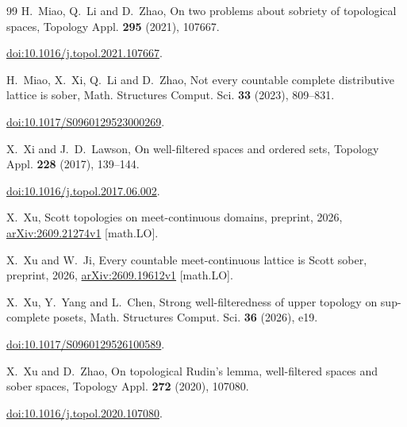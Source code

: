 \documentclass[fleqn,preprint,3p,a4paper]{elsarticle}
\theoremstyle{definition}
\begin{document}
\begin{thebibliography}{99}
H.~Miao, Q.~Li and D.~Zhao,
On two problems about sobriety of topological spaces,
Topology Appl. \textbf{295} (2021), 107667.
\newblock\par\nobreak\noindent\href{https://doi.org/10.1016/j.topol.2021.107667}{doi:10.1016/j.topol.2021.107667}.

H.~Miao, X.~Xi, Q.~Li and D.~Zhao,
Not every countable complete distributive lattice is sober,
Math. Structures Comput. Sci. \textbf{33} (2023), 809--831.
\newblock\par\nobreak\noindent\href{https://doi.org/10.1017/S0960129523000269}{doi:10.1017/S0960129523000269}.

X.~Xi and J.~D.~Lawson, On well-filtered spaces and ordered sets,
Topology Appl. \textbf{228} (2017), 139--144.
\newblock\par\nobreak\noindent\href{https://doi.org/10.1016/j.topol.2017.06.002}{doi:10.1016/j.topol.2017.06.002}.

X.~Xu, Scott topologies on meet-continuous domains,
preprint, 2026, \href{https://arxiv.org/abs/2609.21274v1}{arXiv:2609.21274v1} [math.LO].

X.~Xu and W.~Ji, Every countable meet-continuous lattice is Scott sober,
preprint, 2026, \href{https://arxiv.org/abs/2609.19612v1}{arXiv:2609.19612v1} [math.LO].

X.~Xu, Y.~Yang and L.~Chen,
Strong well-filteredness of upper topology on sup-complete posets,
Math. Structures Comput. Sci. \textbf{36} (2026), e19.
\newblock\par\nobreak\noindent\href{https://doi.org/10.1017/S0960129526100589}{doi:10.1017/S0960129526100589}.

X.~Xu and D.~Zhao,
On topological Rudin's lemma, well-filtered spaces and sober spaces,
Topology Appl. \textbf{272} (2020), 107080.
\newblock\par\nobreak\noindent\href{https://doi.org/10.1016/j.topol.2020.107080}{doi:10.1016/j.topol.2020.107080}.
\end{thebibliography}
\end{document}
